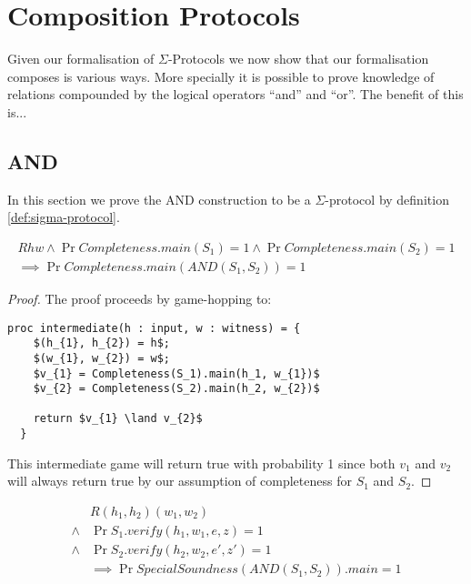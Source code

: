 \section{Composition Protocols}
\label{sec:sigma_comp}
Given our formalisation of $\Sigma$-Protocols we now show that our formalisation
composes is various ways. More specially it is possible to prove knowledge of
relations compounded by the logical operators ``and'' and ``or''.
The benefit of this is...

\subsection{AND}
\label{subsec:sigma_AND}

In this section we prove the AND construction to be a $\Sigma$-protocol by
definition \ref{def:sigma-protocol}.


\begin{lemma}
  \begin{align*}
    R h w \land
    \Pr{Completeness.main(S_{1})} = 1 \land \Pr{Completeness.main(S_{2})} = 1 \\
    \implies \Pr{Completeness.main(AND(S_{1}, S_{2}))} = 1
  \end{align*}
\end{lemma}
\begin{proof}
  The proof proceeds by game-hopping to:
  \begin{lstlisting}[mathescape]
  proc intermediate(h : input, w : witness) = {
    $(h_{1}, h_{2}) = h$;
    $(w_{1}, w_{2}) = w$;
    $v_{1} = Completeness(S_1).main(h_1, w_{1})$
    $v_{2} = Completeness(S_2).main(h_2, w_{2})$

    return $v_{1} \land v_{2}$
  }
  \end{lstlisting}

  This intermediate game will return true with probability 1 since both
  $v_{1}$ and $v_{2}$ will always return true by our assumption of completeness
  for $S_{1}$ and $S_{2}$.
\end{proof}

\begin{lemma}
  \begin{align*}
    &R (h_{1}, h_{2}) (w_{1}, w_{2}) \\
    \land &\Pr{S_{1}.verify(h_{1}, w_{1}, e, z)} = 1 \\
    \land &\Pr{S_{2}.verify(h_{2}, w_{2}, e', z')} = 1 \\
    &\implies \Pr{SpecialSoundness(AND(S_{1}, S_{2})).main} = 1
  \end{align*}
\end{lemma}




